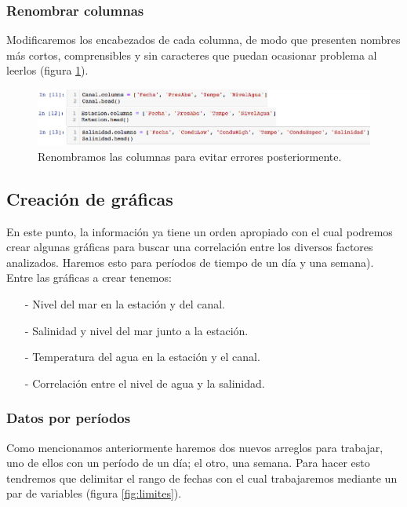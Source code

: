 \documentclass[12pt]{article}
\begin{document}
\subsubsection{Renombrar columnas}

\noindent Modificaremos los encabezados de cada columna, de modo que presenten nombres más cortos, comprensibles y sin caracteres que puedan ocasionar problema al leerlos (figura \ref{fig:renombrar}).

\begin{figure}[h!]
	\center
	\includegraphics[scale=.55]{./Images/renombrar}
	\caption{\label{fig:renombrar} Renombramos las columnas para evitar errores posteriormente.}
\end{figure}

\subsection{Creación de gráficas}

\noindent En este punto, la información ya tiene un orden apropiado con el cual podremos crear algunas gráficas para buscar una correlación entre los diversos factores analizados. Haremos esto para períodos de tiempo de un día y una semana). \\
\indent Entre las gráficas a crear tenemos:

\begin{itemize}
	\item[-] Nivel del mar en la estación y del canal.
	\item[-] Salinidad y nivel del mar junto a la estación.
    \item[-] Temperatura del agua en la estación y el canal.
    \item[-] Correlación entre el nivel de agua y la salinidad.
\end{itemize}

\subsubsection{Datos por períodos}

\noindent Como mencionamos anteriormente haremos dos nuevos arreglos para trabajar, uno de ellos con un período de un día; el otro, una semana. Para hacer esto tendremos que delimitar el rango de fechas con el cual trabajaremos mediante un par de variables (figura \ref{fig:limites}).
\end{document}
